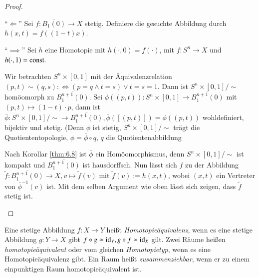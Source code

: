 \documentclass[a4paper,10pt]{scrartcl}
\begin{document}
\begin{proof}
 \begin{seg}{"`$\Longleftarrow$"'}
  Sei $f: \overline{B_1(0)}\to X$ stetig. Definiere die gesuchte Abbildung durch $h(x,t)=f((1-t)x)$.
 \end{seg}
 
\begin{seg}{"`$\implies$"'}
 Sei $h$ eine Homotopie mit $h(\cdot, 0)=f(\cdot)$, mit $f:S^n \to X$ und $h(\cdot, 1)=\text{const}.$
\begin{figure}[H]
\centering
 \fixme[fig42]
\caption{}
\end{figure}
Wir betrachten $S^n\times[0,1]$ mit der Äquivalenzrelation $(p,t)\sim (q,s) :\iff (p=q \land t=s) \lor t=s=1$. Dann ist $S^n\times[0,1]/\sim$ homöomorph zu $\overline{B_1^{n+1}(0)}$. Sei $\phi ((p,t)):S^n\times[0,1]\to \overline{B_1^{n+1}(0)}$ mit $(p,t)\mapsto (1-t)\cdot p$, dann ist $\bar \phi: S^n \times[0,1]/\sim \to \overline{B_1^{n+1}(0)}, \bar \phi([(p,t)])=\phi((p,t))$ wohldefiniert, bijektiv und stetig. (Denn $\phi$ ist stetig, $S^n\times [0,1]/\sim$ trägt die Quotiententopologie, $\phi=\bar \phi \circ q $, $q$ die Quotientenabbildung\\
\begin{center}
\end{center}

Nach Korollar \ref{thm:6.8} ist $\bar \phi$ ein Homöomorphismus, denn $S^n\times [0,1]/\sim$ ist kompakt und $\overline{B_1^{n+1}(0)}$ ist hausdorffsch. Nun lässt sich $f$ zu der Abbildung $\tilde f: \overline{B_1^{n+1}(0)}\to X, v\mapsto \tilde f(v)$ mit $\tilde f(v):= h(x,t)$,
wobei $(x,t)$ ein Vertreter von $\bar \phi^{-1}(v)$ ist. Mit dem selben Argument wie oben lässt sich zeigen, dass $\tilde f$ stetig ist.
\end{seg}
\end{proof}
\begin{df}
 Eine stetige Abbildung $f: X\to Y$ heißt \emph{Homotopieäquivalenz}, wenn es eine stetige Abbildung $g: Y\to X$ gibt $f\circ g \simeq \operatorname{id}_Y, g\circ f \simeq \operatorname{id}_X$ gilt. Zwei
Räume heißen \emph{homotopieäquivalent} oder vom gleichen \emph{Homotopietyp}, wenn es eine Homotopieäquivalenz gibt. Ein Raum heißt \emph{zusammenziehbar}, wenn er zu einem einpunktigen Raum homotopieäquivalent ist.
\end{df}
\end{document}

